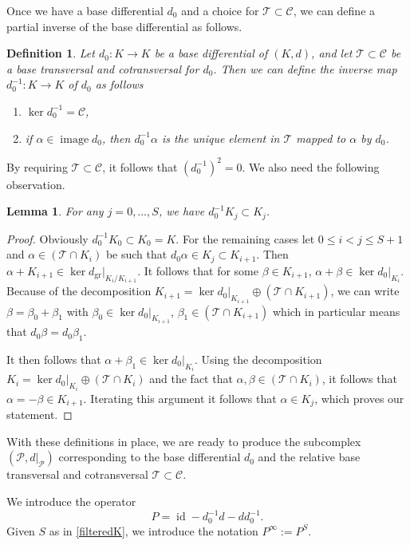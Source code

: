 \documentclass[10pt]{amsart}
\newcounter{dummy} \numberwithin{dummy}{section}
\newtheorem{lemma}[dummy]{Lemma}
\newtheorem{definition}[dummy]{Definition}
\theoremstyle{remark}
\newcommand{\calT}{\mathcal{T}}
\newcommand{\calC}{\mathcal{C}}
\DeclareMathOperator{\id}{id}
\DeclareMathOperator{\image}{image}
\DeclareMathOperator{\gr}{gr}
\numberwithin{equation}{section}
\begin{document}
Once we have a base differential $d_0$ and a choice for $\calT \subset \calC$, we can define a partial inverse  of the base differential as follows.
\begin{definition}\label{d_0 inv} Let $d_0\colon K\to K$ be a base differential of $(K,d)$, and let $\mathcal{T}\subset\mathcal{C}$ be a base transversal and cotransversal for $d_0$. Then we can define the \emph{inverse} map $d_0^{-1}\colon K\to K$ of $d_0$ as follows
\begin{enumerate}[\rm (a)]
\item $\ker d^{-1}_0 = \calC$, 
\item if $\alpha \in \image d_0$, then $d_0^{-1} \alpha$ is the unique element in $\calT$ mapped to $\alpha$ by $d_0$.
\end{enumerate}
\end{definition}
By requiring $\calT \subset \calC$, it follows that $(d_0^{-1})^2 = 0$. We also need the following observation.
\begin{lemma}
For any $j = 0, \dots, S$, we have $d_0^{-1} K_j \subset K_j$.
\end{lemma}
\begin{proof}
Obviously $d_0^{-1} K_0 \subset K_0 = K$. For the remaining cases let $0 \leq i < j \leq S+1$ and  $\alpha \in (\calT \cap K_i)$ be such that $d_0 \alpha \in K_j \subset K_{i+1}$. Then $\alpha +K_{i+1} \in \ker d_{\gr}|_{K_i/K_{i+1}}$. It follows that for some $\beta \in K_{i+1}$, $\alpha +\beta \in \ker d_0|_{K_i}$. Because of the decomposition $K_{i+1} = \ker d_0|_{K_{i+1}} \oplus (\calT \cap K_{i+1})$, we can write $\beta = \beta_0 + \beta_1$ with $\beta_0 \in  \ker d_0|_{K_{i+1}}$, $\beta_1 \in(\calT \cap K_{i+1})$ which in particular means that $d_0 \beta = d_0 \beta_1$.

It then follows that $\alpha + \beta_1 \in \ker d_0|_{K_i}$. Using the decomposition $K_{i} = \ker d_0|_{K_{i}} \oplus (\calT \cap K_{i})$ and the fact that $\alpha, \beta \in (\calT \cap K_{i})$, it follows that $\alpha = -\beta \in K_{i+1}$. Iterating this argument it follows that $\alpha \in K_j$, which proves our statement.
\end{proof}
With these definitions in place, we are ready to produce the subcomplex $(\mathcal{P},d\vert_{\mathcal{P}})$ corresponding to the base differential $d_0$ and the relative base transversal and cotransversal $\mathcal{T}\subset\mathcal{C}$.

We introduce the operator
\begin{equation} \label{Poperator} P = \id - d_0^{-1} d -  dd_0^{-1}.\end{equation}
Given $S$ as in \eqref{filteredK}, we introduce the notation $P^{\infty} := P^{S}$.
\end{document}
